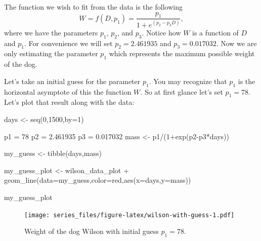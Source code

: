 \documentclass[
]{book}
\newenvironment{Shaded}{\begin{snugshade}}{\end{snugshade}}
\newcommand{\AttributeTok}[1]{\textcolor[rgb]{0.77,0.63,0.00}{#1}}
\newcommand{\DecValTok}[1]{\textcolor[rgb]{0.00,0.00,0.81}{#1}}
\newcommand{\FloatTok}[1]{\textcolor[rgb]{0.00,0.00,0.81}{#1}}
\newcommand{\FunctionTok}[1]{\textcolor[rgb]{0.00,0.00,0.00}{#1}}
\newcommand{\NormalTok}[1]{#1}
\newcommand{\OtherTok}[1]{\textcolor[rgb]{0.56,0.35,0.01}{#1}}
\newcommand{\SpecialCharTok}[1]{\textcolor[rgb]{0.00,0.00,0.00}{#1}}
\newcommand{\StringTok}[1]{\textcolor[rgb]{0.31,0.60,0.02}{#1}}
\theoremstyle{definition}
\theoremstyle{definition}
\theoremstyle{definition}
\theoremstyle{remark}
\begin{document}
The function we wish to fit from the data is the following
\begin{equation}
W =f(D,p_{1})= \frac{p_{1}}{1+e^{(p_{2}-p_{3}D)}},
\end{equation}
where we have the parameters \(p_{1}\), \(p_{2}\), and \(p_{3}\). Notice how \(W\) is a function of \(D\) and \(p_{1}\). For convenience we will set \(p_{2}= 2.461935\) and \(p_{3} = 0.017032\). Now we are only estimating the parameter \(p_{1}\) which represents the maximum possible weight of the dog.

Let's take an initial guess for the parameter \(p_{1}\). You may recognize that \(p_{1}\) is the horizontal asymptote of this the function \(W\). So at first glance let's set \(p_{1}=78\). Let's plot that result along with the data:

\begin{Shaded}
\begin{Highlighting}[]
\NormalTok{days }\OtherTok{\textless{}{-}} \FunctionTok{seq}\NormalTok{(}\DecValTok{0}\NormalTok{,}\DecValTok{1500}\NormalTok{,}\AttributeTok{by=}\DecValTok{1}\NormalTok{)}

\NormalTok{  p1 }\OtherTok{=} \DecValTok{78}
\NormalTok{  p2 }\OtherTok{=} \FloatTok{2.461935}
\NormalTok{  p3 }\OtherTok{=} \FloatTok{0.017032}
\NormalTok{mass }\OtherTok{\textless{}{-}}\NormalTok{  p1}\SpecialCharTok{/}\NormalTok{(}\DecValTok{1}\SpecialCharTok{+}\FunctionTok{exp}\NormalTok{(p2}\SpecialCharTok{{-}}\NormalTok{p3}\SpecialCharTok{*}\NormalTok{days))}

\NormalTok{my\_guess }\OtherTok{\textless{}{-}} \FunctionTok{tibble}\NormalTok{(days,mass)}

\NormalTok{my\_guess\_plot }\OtherTok{\textless{}{-}}\NormalTok{ wilson\_data\_plot }\SpecialCharTok{+}
  \FunctionTok{geom\_line}\NormalTok{(}\AttributeTok{data=}\NormalTok{my\_guess,}\AttributeTok{color=}\StringTok{\textquotesingle{}red\textquotesingle{}}\NormalTok{,}\FunctionTok{aes}\NormalTok{(}\AttributeTok{x=}\NormalTok{days,}\AttributeTok{y=}\NormalTok{mass))}

\NormalTok{my\_guess\_plot}
\end{Highlighting}
\end{Shaded}

\begin{figure}
\centering
\texttt{[image: series\_files/figure-latex/wilson-with-guess-1.pdf]}
\caption{\label{fig:wilson-with-guess}Weight of the dog Wilson with initial guess \(p_{1}=78\).}
\end{figure}
\end{document}
